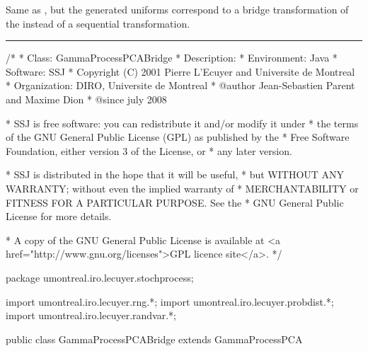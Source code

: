 
Same as , but the generated uniforms
correspond to a bridge transformation of the 
instead of a sequential transformation.

\bigskip\hrule\bigskip

\begin{code}
\begin{hide}
/*
 * Class:        GammaProcessPCABridge
 * Description:
 * Environment:  Java
 * Software:     SSJ
 * Copyright (C) 2001  Pierre L'Ecuyer and Universite de Montreal
 * Organization: DIRO, Universite de Montreal
 * @author       Jean-Sebastien Parent and Maxime Dion
 * @since        july 2008

 * SSJ is free software: you can redistribute it and/or modify it under
 * the terms of the GNU General Public License (GPL) as published by the
 * Free Software Foundation, either version 3 of the License, or
 * any later version.

 * SSJ is distributed in the hope that it will be useful,
 * but WITHOUT ANY WARRANTY; without even the implied warranty of
 * MERCHANTABILITY or FITNESS FOR A PARTICULAR PURPOSE.  See the
 * GNU General Public License for more details.

 * A copy of the GNU General Public License is available at
   <a href="http://www.gnu.org/licenses">GPL licence site</a>.
 */
\end{hide}
package umontreal.iro.lecuyer.stochprocess;\begin{hide}
import umontreal.iro.lecuyer.rng.*;
import umontreal.iro.lecuyer.probdist.*;
import umontreal.iro.lecuyer.randvar.*;

\end{hide}

public class GammaProcessPCABridge extends GammaProcessPCA \begin{hide} {
    protected BrownianMotionBridge BMBridge;
    protected double       mu2OverNu,
                           mu2dTOverNu;
    protected double[]     bMu2dtOverNuL,  // For precomputations for G Bridge
                           bMu2dtOverNuR;
    protected int[]        wIndexList;
\end{hide}
\end{code}
